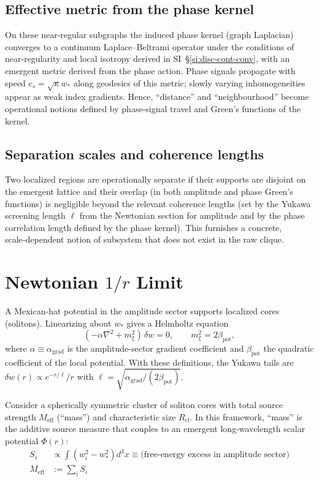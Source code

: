 \documentclass[11pt]{article}
\begin{document}
\subsection{Effective metric from the phase kernel}

On these near‑regular subgraphs the induced phase kernel (graph Laplacian) converges to a continuum Laplace–Beltrami operator under the conditions of near-regularity and local isotropy derived in SI~\S\ref{si:disc-cont-conv}, with an emergent metric derived from the phase action. Phase signals propagate with speed $c_s=\sqrt{\kappa} w_*$ along geodesics of this metric; slowly varying inhomogeneities appear as weak index gradients. Hence, ``distance'' and ``neighbourhood'' become operational notions defined by phase‑signal travel and Green's functions of the kernel.


\subsection{Separation scales and coherence lengths}

Two localized regions are operationally separate if their supports are disjoint on the emergent lattice and their overlap (in both amplitude and phase Green's functions) is negligible beyond the relevant coherence lengths (set by the Yukawa screening length $\ell$ from the Newtonian section for amplitude and by the phase correlation length defined by the phase kernel). This furnishes a concrete, scale‑dependent notion of subsystem that does not exist in the raw clique.


\section{Newtonian $1/r$ Limit}
A Mexican-hat potential in the amplitude sector supports localized cores (solitons). Linearizing about $w_*$ gives a Helmholtz equation
\begin{equation}
(-\alpha\nabla^2 + m_\xi^2)\,\delta w = 0,\qquad m_\xi^2=2\beta_{\mathrm{pot}},
\end{equation}
where $\alpha\equiv \alpha_{\mathrm{grad}}$ is the amplitude-sector gradient coefficient and $\beta_{\mathrm{pot}}$ the quadratic coefficient of the local potential. With these definitions, the Yukawa tails are $\delta w(r)\propto e^{-r/\ell}/r$ with $\ell=\sqrt{\alpha_{\mathrm{grad}}/(2\beta_{\mathrm{pot}})}$. 

Consider a spherically symmetric cluster of soliton cores with total source strength $M_{\text{eff}}$ (``mass'') and characteristic size $R_{\text{cl}}$. In this framework, ``mass'' is the additive source measure that couples to an emergent long‑wavelength scalar potential $\Phi(r)$:
\begin{align}
S_i &\propto \int (w_i^2 - w_*^2) d^3x \equiv \text{(free‑energy excess in amplitude sector)}\\
M_{\text{eff}} &:= \sum_i S_i
\end{align}
\end{document}
